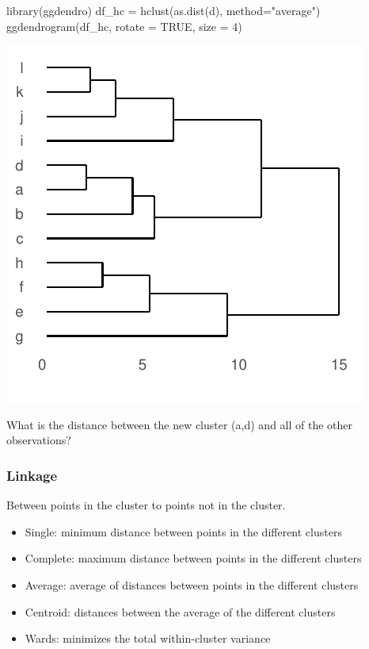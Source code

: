 \documentclass[a4paper]{article}\usepackage[]{graphicx}\usepackage[]{xcolor}
\makeatletter
\def\maxwidth{ %
  \ifdim\Gin@nat@width>\linewidth
    \linewidth
  \else
    \Gin@nat@width
  \fi
}
\makeatother
\begin{document}
\begin{minipage}[t]{0.49\textwidth}
\begin{Schunk}
\begin{Sinput}
library(ggdendro)
df_hc = hclust(as.dist(d), method="average")
ggdendrogram(df_hc, rotate = TRUE, size = 4)
\end{Sinput}


{\centering \includegraphics[width=\maxwidth]{figure/listings-unnamed-chunk-482-1} 

}

\end{Schunk}
\end{minipage}
What is the distance between the new cluster (a,d) and all of the other observations?
\subsubsection{Linkage}
Between points in the cluster to points not in the cluster. 
\begin{itemize}
	\item Single: minimum distance between points in the different clusters
	\item Complete: maximum distance between points in the different clusters
	\item Average: average of distances between points in the different clusters
	\item Centroid: distances between the average of the different clusters
	\item Wards: minimizes the total within-cluster variance
\end{itemize}
\end{document}
